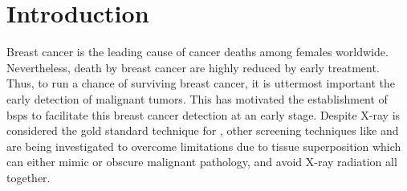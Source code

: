 \graphicspath{ {./content/intro/figures/} }

\section*{Introduction}
\label{sec:intro}  %

Breast cancer is the leading cause of cancer deaths among females worldwide.%
Nevertheless, death by breast cancer are highly reduced by early treatment.
Thus, to run a chance of surviving breast cancer, it is uttermost important the early detection of malignant tumors.
This has motivated the establishment of \acp{bsp} to facilitate this breast cancer detection at an early stage.
Despite X-ray \dm is considered the gold standard technique for \bsp, other screening techniques like \us and \mri are being investigated
to overcome \dm limitations due to tissue superposition which can either mimic or obscure malignant pathology,
and avoid X-ray radiation all together.




